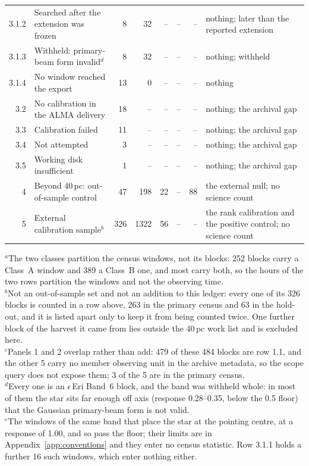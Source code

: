 \begin{tabular}{@{}r@{~}p{}rrrrrp{}@{}}
3.1.2 & \hspace{1.6em}Searched after the extension was frozen & 8 & 32 & -- & -- & -- & nothing; later than the reported extension \\
3.1.3 & \hspace{1.6em}Withheld: primary-beam form invalid$^{d}$ & 8 & 32 & -- & -- & -- & nothing; withheld \\
3.1.4 & \hspace{1.6em}No window reached the export & 13 & 0 & -- & -- & -- & nothing \\
3.2 & \hspace{0.8em}No calibration in the ALMA delivery & 18 & -- & -- & -- & -- & nothing; the archival gap \\
3.3 & \hspace{0.8em}Calibration failed & 11 & -- & -- & -- & -- & nothing; the archival gap \\
3.4 & \hspace{0.8em}Not attempted & 3 & -- & -- & -- & -- & nothing; the archival gap \\
3.5 & \hspace{0.8em}Working disk insufficient & 1 & -- & -- & -- & -- & nothing; the archival gap \\
\hline
4 & Beyond 40\,pc: out-of-sample control & 47 & 198 & 22 & -- & 88 & the external null; no science count \\
5 & External calibration sample$^{b}$ & 326 & 1322 & 56 & -- & -- & the rank calibration and the positive control; no science count \\
\hline
\end{tabular}

{\footnotesize $^{a}$The two classes partition the census windows, not its blocks: 252 blocks carry a Class~A window and 389 a Class~B one, and most carry both, so the hours of the two rows partition the windows and not the observing time.\\ $^{b}$Not an out-of-sample set and not an addition to this ledger: every one of its 326 blocks is counted in a row above, 263 in the primary census and 63 in the hold-out, and it is listed apart only to keep it from being counted twice. One further block of the harvest it came from lies outside the 40\,pc work list and is excluded here.\\ $^{c}$Panels 1 and 2 overlap rather than add: 479 of these 484 blocks are row 1.1, and the other 5 carry no member observing unit in the archive metadata, so the scope query does not expose them; 3 of the 5 are in the primary census.\\ $^{d}$Every one is an $\epsilon$\,Eri Band~6 block, and the band was withheld whole: in most of them the star sits far enough off axis (response 0.28--0.35, below the 0.5 floor) that the Gaussian primary-beam form is not valid.\\ $^{e}$The windows of the same band that place the star at the pointing centre, at a response of 1.00, and so pass the floor; their limits are in Appendix~\ref{app:conventions} and they enter no census statistic. Row 3.1.1 holds a further 16 such windows, which enter nothing either.}
